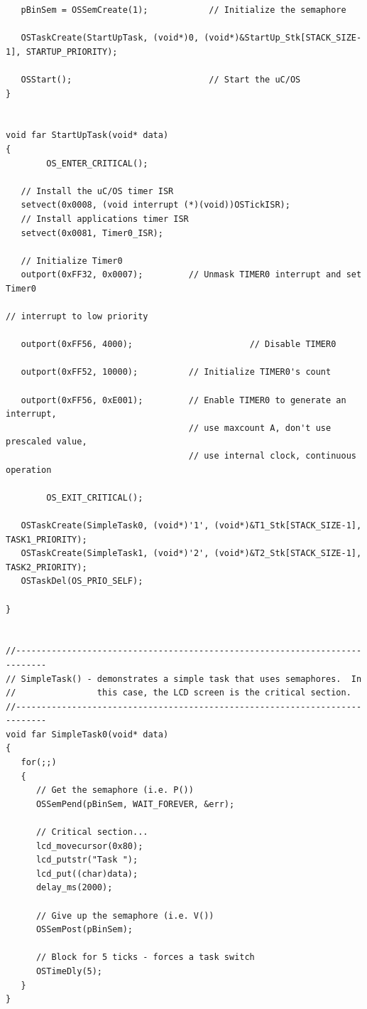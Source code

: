 \documentclass{article}	%
\begin{document}
\begin{verbatim}
   pBinSem = OSSemCreate(1);            // Initialize the semaphore

   OSTaskCreate(StartUpTask, (void*)0, (void*)&StartUp_Stk[STACK_SIZE-1], STARTUP_PRIORITY);

   OSStart();                           // Start the uC/OS
}


void far StartUpTask(void* data)
{
        OS_ENTER_CRITICAL();

   // Install the uC/OS timer ISR
   setvect(0x0008, (void interrupt (*)(void))OSTickISR);
   // Install applications timer ISR
   setvect(0x0081, Timer0_ISR);

   // Initialize Timer0
   outport(0xFF32, 0x0007);         // Unmask TIMER0 interrupt and set Timer0
                                                                                        // interrupt to low priority

   outport(0xFF56, 4000);                       // Disable TIMER0

   outport(0xFF52, 10000);          // Initialize TIMER0's count

   outport(0xFF56, 0xE001);         // Enable TIMER0 to generate an interrupt,
                                    // use maxcount A, don't use prescaled value,
                                    // use internal clock, continuous operation

        OS_EXIT_CRITICAL();

   OSTaskCreate(SimpleTask0, (void*)'1', (void*)&T1_Stk[STACK_SIZE-1], TASK1_PRIORITY);
   OSTaskCreate(SimpleTask1, (void*)'2', (void*)&T2_Stk[STACK_SIZE-1], TASK2_PRIORITY);
   OSTaskDel(OS_PRIO_SELF);

}


//----------------------------------------------------------------------------
// SimpleTask() - demonstrates a simple task that uses semaphores.  In
//                this case, the LCD screen is the critical section.
//----------------------------------------------------------------------------
void far SimpleTask0(void* data)
{
   for(;;)
   {
      // Get the semaphore (i.e. P())
      OSSemPend(pBinSem, WAIT_FOREVER, &err);

      // Critical section...
      lcd_movecursor(0x80);
      lcd_putstr("Task ");
      lcd_put((char)data);
      delay_ms(2000);

      // Give up the semaphore (i.e. V())
      OSSemPost(pBinSem);

      // Block for 5 ticks - forces a task switch
      OSTimeDly(5);
   }
}



\end{verbatim}
\end{document}
